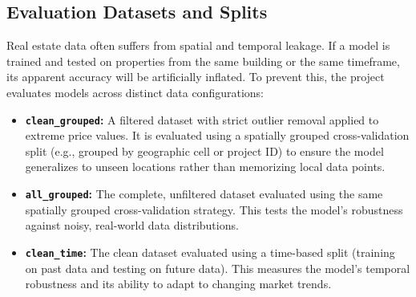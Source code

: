 \subsection{Evaluation Datasets and Splits}
Real estate data often suffers from spatial and temporal leakage. If a model is trained and tested on properties from the same building or the same timeframe, its apparent accuracy will be artificially inflated. To prevent this, the project evaluates models across distinct data configurations:
\begin{itemize}
    \item \textbf{\texttt{clean\_grouped}:} A filtered dataset with strict outlier removal applied to extreme price values. It is evaluated using a spatially grouped cross-validation split (e.g., grouped by geographic cell or project ID) to ensure the model generalizes to unseen locations rather than memorizing local data points.
    \item \textbf{\texttt{all\_grouped}:} The complete, unfiltered dataset evaluated using the same spatially grouped cross-validation strategy. This tests the model's robustness against noisy, real-world data distributions.
    \item \textbf{\texttt{clean\_time}:} The clean dataset evaluated using a time-based split (training on past data and testing on future data). This measures the model's temporal robustness and its ability to adapt to changing market trends.
\end{itemize}

